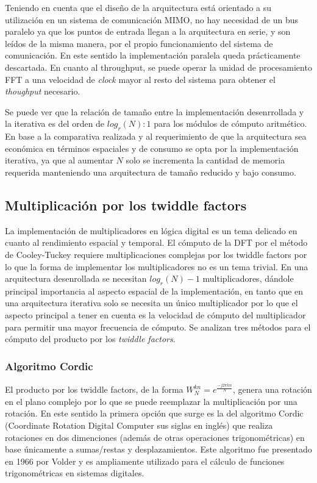 Teniendo en cuenta que el diseño de la arquitectura está orientado a su utilización en un sistema de
comunicación MIMO, no hay necesidad de un bus paralelo ya que los puntos de entrada llegan a la
arquitectura en serie, y son leídos de la misma manera, por el propio funcionamiento del sistema de
comunicación. En este sentido la implementación paralela queda prácticamente descartada. 
En cuanto al throughput, se puede operar la unidad de procesamiento FFT a una velocidad de
\textit{clock} mayor al resto del sistema para obtener el \textit{thoughput} necesario.

Se puede ver que la relación de tamaño entre la implementación desenrrollada y la iterativa
es del orden de $log_r(N):1$ para los módulos de cómputo aritmético. En base a la comparativa
realizada y al requerimiento de que la arquitectura sea económica en términos espaciales y de consumo se opta
por la implementación iterativa, ya que al aumentar $N$ solo se incrementa la cantidad de memoria
requerida manteniendo una arquitectura de tamaño reducido y bajo consumo. 

\subsection{Multiplicación por los twiddle factors} \label{sec:twiddlesec}

La implementación de multiplicadores en lógica digital es un tema delicado en cuanto al rendimiento
espacial y temporal. El cómputo de la DFT por el método de Cooley-Tuckey
requiere multiplicaciones complejas por los twiddle factors por lo que la forma de
implementar los multiplicadores no es un tema trivial. En una arquitectura desenrollada se necesitan
$log_r(N) - 1$ multiplicadores, dándole principal importancia al aspecto espacial de la
implementación, en tanto que en una arquitectura iterativa solo se necesita un único multiplicador
por lo que el aspecto principal a tener en cuenta es la velocidad de cómputo del multiplicador para
permitir una mayor frecuencia de cómputo.
Se analizan tres métodos para el cómputo del producto por los \textit{twiddle factors}.

\subsubsection{Algoritmo Cordic} \label{sec:cordicsec}

El producto por los twiddle factors, de la forma $W_N^{kn}=e^{\frac{-j2\pi kn}{N}}$, genera una
rotación en el plano complejo por lo que se puede reemplazar la multiplicación por una rotación.
En este sentido la primera opción que surge es la del algoritmo Cordic (Coordinate Rotation Digital
Computer sus siglas en inglés) que realiza rotaciones en dos dimenciones (además de otras
operaciones trigonométricas) en base únicamente a sumas/restas y desplazamientos.
Este algoritmo fue presentado en 1966 por Volder \cite{Volder} y es ampliamente utilizado para el
cálculo de funciones trigonométricas en sistemas digitales.

